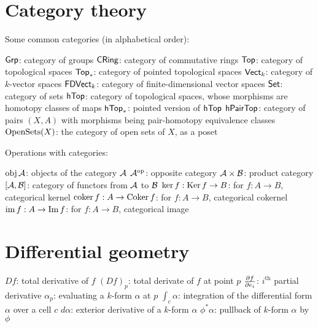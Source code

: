 \section{Category theory}
Some common categories (in alphabetical order):
\begin{itemize}
	\ii $\catname{Grp}$: category of groups
	\ii $\catname{CRing}$: category of commutative rings
	\ii $\catname{Top}$: category of topological spaces
	\ii $\catname{Top}_\ast$: category of pointed topological spaces
	\ii $\catname{Vect}_k$: category of $k$-vector spaces
	\ii $\catname{FDVect}_k$: category of finite-dimensional vector spaces
	\ii $\catname{Set}$: category of sets
	\ii $\catname{hTop}$: category of topological spaces,
	whose morphisms are homotopy classes of maps
	\ii $\catname{hTop}_\ast$: pointed version of $\catname{hTop}$
	\ii $\catname{hPairTop}$: category of pairs $(X,A)$ with morphisms
	being pair-homotopy equivalence classes
	\ii $\Opens(X)$: the category of open sets of $X$, as a poset
\end{itemize}
Operations with categories:
\begin{itemize}
	\ii $\obj \AA$: objects of the category $\AA$
	\ii $\AA\op$: opposite category
	\ii $\AA \times \BB$: product category
	\ii $[\AA, \BB]$: category of functors from $\AA$ to $\BB$
	\ii $\ker f : \Ker f \to B$: for $f : A \to B$, categorical kernel
	\ii $\coker f : A \to \Coker f$: for $f : A \to B$, categorical cokernel
	\ii $\img f : A \to \Img f$: for $f : A \to B$, categorical image
\end{itemize}

\section{Differential geometry}
\begin{itemize}
	\ii $Df$: total derivative of $f$
	\ii $(Df)_p$: total derivate of $f$ at point $p$
	\ii $\fpartial{f}{e_i}$: $i^{\text{th}}$ partial derivative
	\ii $\alpha_p$: evaluating a $k$-form $\alpha$ at $p$
	\ii $\int_c \alpha$: integration of the differential form $\alpha$ over a cell $c$
	\ii $d\alpha$: exterior derivative of a $k$-form $\alpha$
	\ii $\phi^\ast \alpha$: pullback of $k$-form $\alpha$ by $\phi$
\end{itemize}

